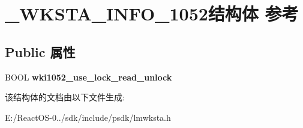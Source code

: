 \hypertarget{struct___w_k_s_t_a___i_n_f_o__1052}{}\section{\+\_\+\+W\+K\+S\+T\+A\+\_\+\+I\+N\+F\+O\+\_\+1052结构体 参考}
\label{struct___w_k_s_t_a___i_n_f_o__1052}
\subsection*{Public 属性}
\begin{DoxyCompactItemize}
\item 
\mbox{\label{struct___w_k_s_t_a___i_n_f_o__1052_acd0bd0f8a9cbbbc559fefdb3981e319c}} 
B\+O\+OL {\bfseries wki1052\+\_\+use\+\_\+lock\+\_\+read\+\_\+unlock}
\end{DoxyCompactItemize}


该结构体的文档由以下文件生成\+:\begin{DoxyCompactItemize}
\item 
E\+:/\+React\+O\+S-\/0../sdk/include/psdk/lmwksta.\+h\end{DoxyCompactItemize}
